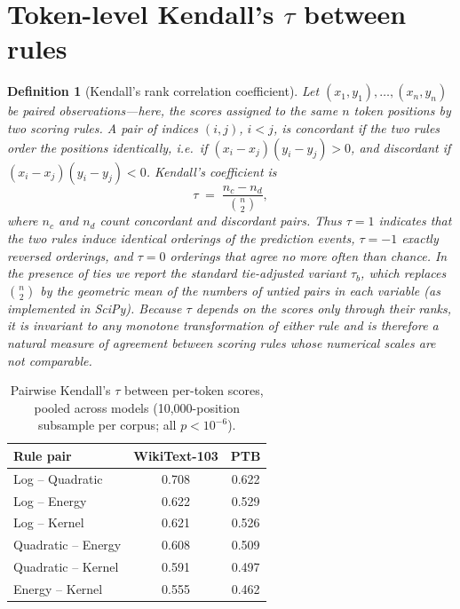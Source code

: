 \documentclass{article}
\newtheorem{definition}{Definition}
\begin{document}
\section{Token-level Kendall's $\tau$ between rules}
\label{app:tau}

\begin{definition}[Kendall's rank correlation coefficient]
Let $(x_1, y_1), \dots, (x_n, y_n)$ be paired observations---here, the scores assigned to
the same $n$ token positions by two scoring rules. A pair of indices $(i,j)$, $i<j$, is
\emph{concordant} if the two rules order the positions identically, i.e.\ if
$(x_i - x_j)(y_i - y_j) > 0$, and \emph{discordant} if
$(x_i - x_j)(y_i - y_j) < 0$. Kendall's coefficient is
\[
  \tau \;=\; \frac{n_c - n_d}{\binom{n}{2}},
\]
where $n_c$ and $n_d$ count concordant and discordant pairs. Thus $\tau = 1$ indicates
that the two rules induce identical orderings of the prediction events, $\tau = -1$
exactly reversed orderings, and $\tau = 0$ orderings that agree no more often than
chance. In the presence of ties we report the standard tie-adjusted variant $\tau_b$,
which replaces $\binom{n}{2}$ by the geometric mean of the numbers of untied pairs in
each variable (as implemented in SciPy). Because $\tau$ depends on the scores only
through their ranks, it is invariant to any monotone transformation of either rule and
is therefore a natural measure of agreement between scoring rules whose numerical scales
are not comparable.
\end{definition}

\begin{table}[H]
  \caption{Pairwise Kendall's $\tau$ between per-token scores, pooled across models
  (10{,}000-position subsample per corpus; all $p < 10^{-6}$).}
  \label{tab:tau}
  \centering
  \small
  \begin{tabular}{lcc}
    \toprule
    Rule pair & WikiText-103 & PTB \\
    \midrule
    Log -- Quadratic    & 0.708 & 0.622 \\
    Log -- Energy       & 0.622 & 0.529 \\
    Log -- Kernel       & 0.621 & 0.526 \\
    Quadratic -- Energy & 0.608 & 0.509 \\
    Quadratic -- Kernel & 0.591 & 0.497 \\
    Energy -- Kernel    & 0.555 & 0.462 \\
    \bottomrule
  \end{tabular}
\end{table}
\end{document}
